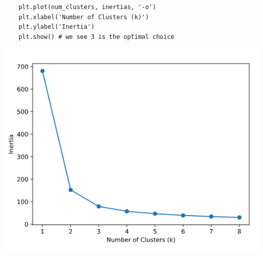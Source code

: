 \documentclass[11pt, a4paper]{article}
\begin{document}
\begin{spacing}{1.1}
\begin{minipage}[c]{9cm}
\begin{lstlisting}
	plt.plot(num_clusters, inertias, '-o')
	plt.xlabel('Number of Clusters (k)')
	plt.ylabel('Inertia')
	plt.show() # we see 3 is the optimal choice \end{lstlisting} \vspace*{1mm}
	\end{minipage}
	\begin{minipage}[c]{9cm}
	\includegraphics[scale=.53]{inertia}
	\end{minipage} \\
	

\end{spacing}
\end{document}
